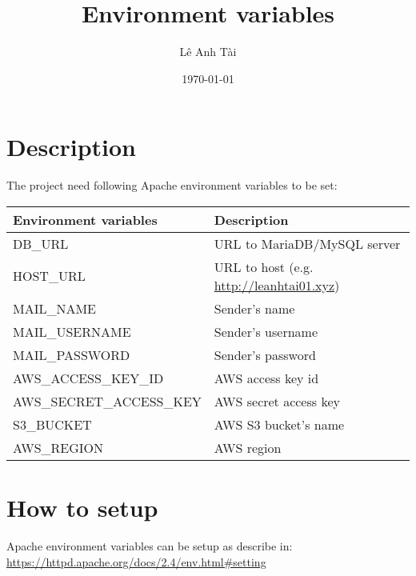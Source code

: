 \documentclass[11pt]{article}
\author{Lê Anh Tài}
\date{\today}
\title{Environment variables}
\begin{document}
\maketitle
\tableofcontents

\section{Description}
\label{sec:org298799f}
The project need following Apache environment variables to be set:
\begin{center}
\begin{tabular}{ll}
Environment variables & Description\\
\hline
DB\_URL & URL to MariaDB/MySQL server\\
HOST\_URL & URL to host (e.g. \url{http://leanhtai01.xyz})\\
MAIL\_NAME & Sender's name\\
MAIL\_USERNAME & Sender's username\\
MAIL\_PASSWORD & Sender's password\\
AWS\_ACCESS\_KEY\_ID & AWS access key id\\
AWS\_SECRET\_ACCESS\_KEY & AWS secret access key\\
S3\_BUCKET & AWS S3 bucket's name\\
AWS\_REGION & AWS region\\
\end{tabular}
\end{center}
\section{How to setup}
\label{sec:org7d05310}
Apache environment variables can be setup as describe in:
\url{https://httpd.apache.org/docs/2.4/env.html\#setting}
\end{document}
